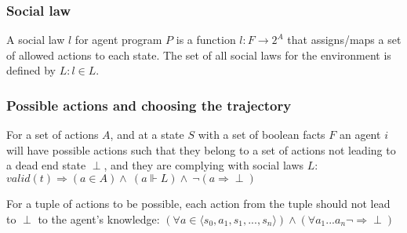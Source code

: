 \subsubsection{Social law}
A social law $l$ for agent program $P$ is a function  $l: F \to 2^A$ that assigns/maps a set of allowed actions to each state. The set of all social laws for the environment is defined by $L: l \in L$.
\subsubsection{Possible actions and choosing the trajectory}
For a set of actions $A$, and at a state $S$ with a set of boolean facts $F$ an agent $i$ will have possible actions such that they belong to a set of actions not leading to a dead end state $\perp $, and they are complying with social laws $L$: $valid(t) \Rightarrow (a \in A) \land\ (a \Vdash L) \land\  \neg(a \Rightarrow \perp)$

For a tuple of actions to be possible, each action from the tuple should not lead to $\perp$ to the agent's knowledge: $(\forall a \in \langle s_0, a_1, s_1, ..., s_n \rangle) \land (\forall {a_1...a_n} \neg \Rightarrow \perp)$
% 
\printbibliography